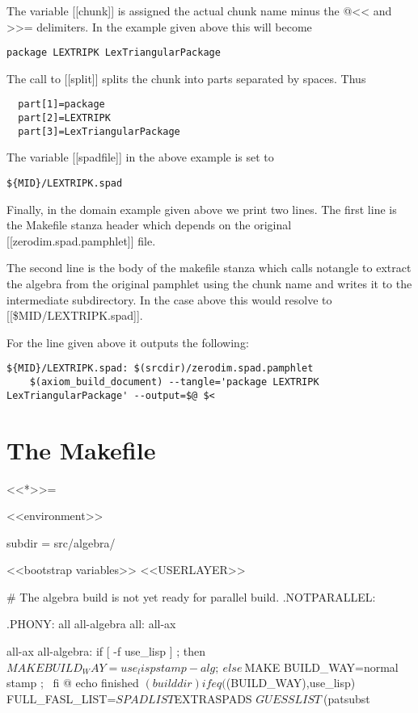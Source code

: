 \documentclass{article}
\begin{document}
The variable [[chunk]] is assigned the actual chunk name minus
the @<< and >>= delimiters. In the example given above this will become
\begin{verbatim}
package LEXTRIPK LexTriangularPackage
\end{verbatim}
The call to [[split]] splits the chunk into parts separated
by spaces. Thus
\begin{verbatim}
  part[1]=package
  part[2]=LEXTRIPK
  part[3]=LexTriangularPackage
\end{verbatim}
The variable [[spadfile]] in the above example is set to
\begin{verbatim}
${MID}/LEXTRIPK.spad
\end{verbatim}
Finally, in the domain example given above we print two lines.
The first line is the Makefile stanza header which depends on the
original [[zerodim.spad.pamphlet]] file.

The second line is the body of the makefile stanza which calls
notangle to extract the algebra from the original pamphlet using
the chunk name and writes it to the intermediate subdirectory. In
the case above this would resolve to [[\${MID}/LEXTRIPK.spad]].

For the line given above it outputs the following:
\begin{verbatim}
${MID}/LEXTRIPK.spad: $(srcdir)/zerodim.spad.pamphlet
	$(axiom_build_document) --tangle='package LEXTRIPK LexTriangularPackage' --output=$@ $<
\end{verbatim}


\section{The Makefile}

<<*>>=

<<environment>>

subdir = src/algebra/


<<bootstrap variables>>
<<USERLAYER>>

# The algebra build is not yet ready for parallel build.
.NOTPARALLEL:

.PHONY: all all-algebra
all: all-ax

all-ax all-algebra:
	if [ -f use_lisp ] ; then \
          ${MAKE} BUILD_WAY=use_lisp stamp-alg ; \
	else \
	  ${MAKE} BUILD_WAY=normal stamp ; \
	fi
	@ echo finished $(builddir)

ifeq ($(BUILD_WAY),use_lisp)
FULL_FASL_LIST=${SPADLIST} ${EXTRASPADS} ${GUESSLIST} \
               $(patsubst %
\end{document}
